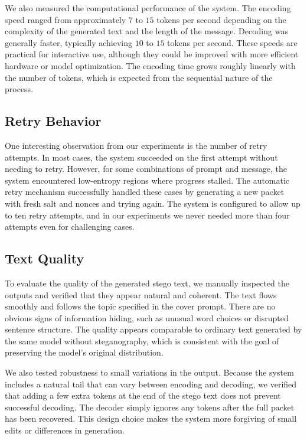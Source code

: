 \documentclass[sigconf,review,anonymous]{acmart}
\begin{document}
We also measured the computational performance of the system. The encoding speed ranged from approximately $7$ to $15$ tokens per second depending on the complexity of the generated text and the length of the message. Decoding was generally faster, typically achieving $10$ to $15$ tokens per second. These speeds are practical for interactive use, although they could be improved with more efficient hardware or model optimization. The encoding time grows roughly linearly with the number of tokens, which is expected from the sequential nature of the process.

\subsection{Retry Behavior}

One interesting observation from our experiments is the number of retry attempts. In most cases, the system succeeded on the first attempt without needing to retry. However, for some combinations of prompt and message, the system encountered low-entropy regions where progress stalled. The automatic retry mechanism successfully handled these cases by generating a new packet with fresh salt and nonces and trying again. The system is configured to allow up to ten retry attempts, and in our experiments we never needed more than four attempts even for challenging cases.

\subsection{Text Quality}

To evaluate the quality of the generated stego text, we manually inspected the outputs and verified that they appear natural and coherent. The text flows smoothly and follows the topic specified in the cover prompt. There are no obvious signs of information hiding, such as unusual word choices or disrupted sentence structure. The quality appears comparable to ordinary text generated by the same model without steganography, which is consistent with the goal of preserving the model's original distribution.

We also tested robustness to small variations in the output. Because the system includes a natural tail that can vary between encoding and decoding, we verified that adding a few extra tokens at the end of the stego text does not prevent successful decoding. The decoder simply ignores any tokens after the full packet has been recovered. This design choice makes the system more forgiving of small edits or differences in generation.
\end{document}

